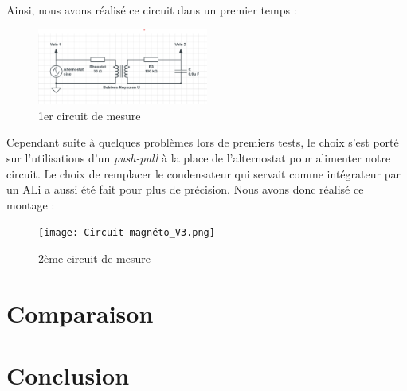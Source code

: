 \documentclass[11pt]{article}
\begin{document}
Ainsi, nous avons réalisé ce circuit dans un premier temps :
\begin{figure}[H]
    \centering
    \includegraphics[width=0.5\textwidth]{Circuit magnéto.png}
    \caption{1er circuit de mesure}
    \label{fig:montage_experience}
\end{figure}

Cependant suite à quelques problèmes lors de premiers tests, le choix s'est porté sur l'utilisations
d'un \textit{push-pull} à la place de l'alternostat pour alimenter notre circuit. Le choix de remplacer
le condensateur qui servait comme intégrateur par un ALi a aussi été fait pour plus de précision. Nous
avons donc réalisé ce montage :
\begin{figure}[H]
    \centering
    \texttt{[image: Circuit magnéto\_V3.png]}
    \caption{2ème circuit de mesure}
    \label{fig:montage_experience_2}
\end{figure}

\section{Comparaison}

\section{Conclusion}



\end{document}
